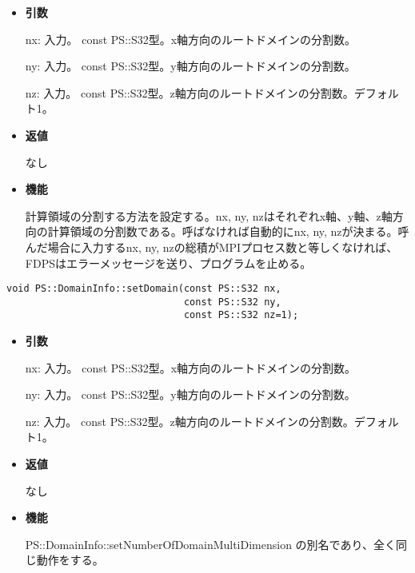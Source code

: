\begin{itemize}

\item {\bf 引数}

nx: 入力。 const PS::S32型。x軸方向のルートドメインの分割数。

ny: 入力。 const PS::S32型。y軸方向のルートドメインの分割数。

nz: 入力。 const PS::S32型。z軸方向のルートドメインの分割数。デフォル
ト1。

\item {\bf 返値}

なし

\item {\bf 機能}

計算領域の分割する方法を設定する。nx, ny, nzはそれぞれx軸、y軸、z軸方
向の計算領域の分割数である。呼ばなければ自動的にnx, ny, nzが決まる。呼
んだ場合に入力するnx, ny, nzの総積がMPIプロセス数と等しくなければ、
FDPSはエラーメッセージを送り、プログラムを止める。

\end{itemize}


\begin{screen}
\begin{verbatim}
void PS::DomainInfo::setDomain(const PS::S32 nx,
                               const PS::S32 ny,
                               const PS::S32 nz=1);
\end{verbatim}
\end{screen}

\begin{itemize}

\item {\bf 引数}

nx: 入力。 const PS::S32型。x軸方向のルートドメインの分割数。

ny: 入力。 const PS::S32型。y軸方向のルートドメインの分割数。

nz: 入力。 const PS::S32型。z軸方向のルートドメインの分割数。デフォル
ト1。

\item {\bf 返値}

なし

\item {\bf 機能}

PS::DomainInfo::setNumberOfDomainMultiDimension の別名であり、全く同じ動作をする。

\end{itemize}

